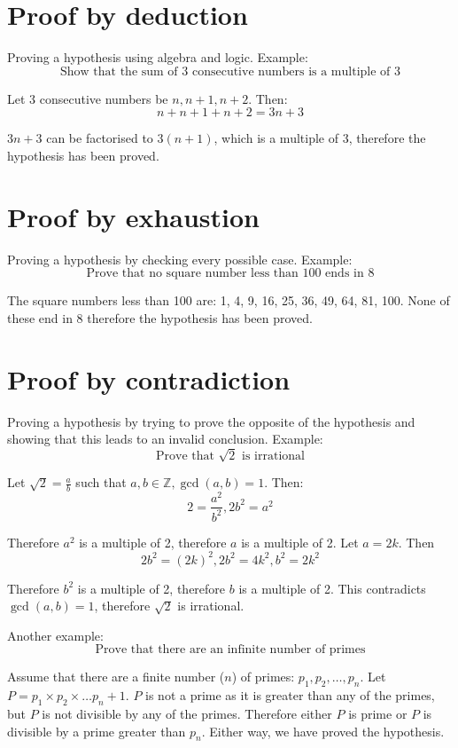 \documentclass[a4paper]{report}
\begin{document}
\section{Proof by deduction}

Proving a hypothesis using algebra and logic. Example: \[ \text{Show that the sum of 3 consecutive
numbers is a multiple of 3} \]

Let 3 consecutive numbers be \( n, n + 1, n + 2 \). Then: \[ n + n + 1 + n + 2 = 3n + 3 \]

\( 3n + 3 \) can be factorised to \( 3(n + 1) \), which is a multiple of 3, therefore the
hypothesis has been proved.

\section{Proof by exhaustion}

Proving a hypothesis by checking every possible case. Example: \[ \text{Prove that no square number
less than 100 ends in 8} \]

The square numbers less than 100 are: 1, 4, 9, 16, 25, 36, 49, 64, 81, 100. None of these end in 8
therefore the hypothesis has been proved.

\section{Proof by contradiction}

Proving a hypothesis by trying to prove the opposite of the hypothesis and showing that this leads
to an invalid conclusion. Example: \[ \text{Prove that } \sqrt{2} \text{ is irrational} \]

Let \( \sqrt{2} = \frac{a}{b} \) such that \( a, b \in \mathbb{Z}, \gcd(a, b) = 1 \). Then: \[ 2 =
\frac{a^2}{b^2}, 2b^2 = a^2 \]

Therefore \( a^2 \) is a multiple of 2, therefore \( a \) is a multiple of 2. Let \( a = 2k \).
Then \[ 2b^2 = (2k)^2, 2b^2 = 4k^2, b^2 = 2k^2 \]

Therefore \( b^2 \) is a multiple of 2, therefore \( b \) is a multiple of 2. This contradicts
\( \gcd(a, b) = 1 \), therefore \( \sqrt{2} \) is irrational.

Another example: \[ \text{Prove that there are an infinite number of primes} \]

Assume that there are a finite number (\( n \)) of primes: \( p_1, p_2, \dots, p_n \). Let \( P =
p_1 \times p_2 \times \dots p_n + 1 \). \( P \) is not a prime as it is greater than any of the
primes, but \( P \) is not divisible by any of the primes. Therefore either \( P \) is prime or
\( P \) is divisible by a prime greater than \( p_n \). Either way, we have proved the hypothesis.
\end{document}

